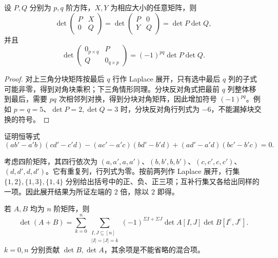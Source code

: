 \begin{corollary}[分块三角与分块反对角]
\label{cor:xie-ex-det-blocks}
设 $P,Q$ 分别为 $p,q$ 阶方阵，$X,Y$ 为相应大小的任意矩阵，则
\begin{equation}
\label{eq:xie-ex-det-block-triangular}
\det\begin{pmatrix}P&X\\0&Q\end{pmatrix}
=\det\begin{pmatrix}P&0\\Y&Q\end{pmatrix}
=\det P\det Q,
\end{equation}
并且
\begin{equation}
\label{eq:xie-ex-det-block-antidiagonal}
\det\begin{pmatrix}0_{p\times q}&P\\Q&0_{q\times p}\end{pmatrix}
=(-1)^{pq}\det P\det Q.
\end{equation}
\end{corollary}

\begin{proof}
对上三角分块矩阵按最后 $q$ 行作 Laplace 展开，只有选中最后 $q$ 列的子式可能非零，得到对角块乘积；下三角情形同理。分块反对角式把最前 $q$ 列整体移到最后，需要 $pq$ 次相邻列对换，得到分块对角矩阵，因此增加符号 $(-1)^{pq}$。例如 $p=q=5$、$\det P=2,\det Q=3$ 时，分块反对角行列式为 $-6$，不能漏掉块交换的符号。
\end{proof}

\begin{example}
\label{ex:xie-ex-det-plucker}
证明恒等式
\[
(ab'-a'b)(cd'-c'd)-(ac'-a'c)(bd'-b'd)
+(ad'-a'd)(bc'-b'c)=0.
\]
\end{example}

\begin{solve}
考虑四阶矩阵，其四行依次为 $(a,a',a,a')$、$(b,b',b,b')$、$(c,c',c,c')$、$(d,d',d,d')$。它有重复列，行列式为零。按前两列作 Laplace 展开，行集 $\{1,2\},\{1,3\},\{1,4\}$ 分别给出括号中的正、负、正三项；互补行集又各给出同样的一项。因此展开结果为所证左端的 $2$ 倍，除以 $2$ 即得。
\end{solve}

\begin{proposition}[两个矩阵之和的行列式]
\label{prop:xie-ex-det-sum-minors}
若 $A,B$ 均为 $n$ 阶矩阵，则
\begin{equation}
\label{eq:xie-ex-det-sum-minors}
\det(A+B)=\sum_{k=0}^{n}
\sum_{\substack{I,J\subseteq[n]\\|I|=|J|=k}}
(-1)^{\Sigma I+\Sigma J}\det A[I,J]\det B[I^{\mathrm c},J^{\mathrm c}].
\end{equation}
$k=0,n$ 分别贡献 $\det B,\det A$，其余项是不能省略的混合项。
\end{proposition}

